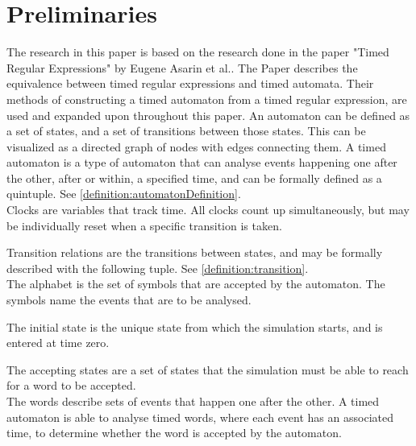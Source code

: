 \section{Preliminaries}






The research in this paper is based on the research done in the paper "Timed Regular Expressions" by Eugene Asarin et al.\cite{Eugene2001}. The Paper describes the equivalence between timed regular expressions and timed automata. Their methods of constructing a timed automaton from a timed regular expression, are used and expanded upon throughout this paper.
An automaton can be defined as a set of states, and a set of transitions between those states. This can be visualized as a directed graph of nodes with edges connecting them.
A timed automaton is a type of automaton that can analyse events happening one after the other, after or within, a specified time, and can be formally defined as a quintuple\cite{ALUR1994}. See \cref{definition:automatonDefinition}.
\\

Clocks are variables that track time. All clocks count up simultaneously, but may be individually reset when a specific transition is taken.

Transition relations are the transitions between states, and may be formally described with the following tuple. See \cref{definition:transition}.
\\

The alphabet is the set of symbols that are accepted by the automaton. The symbols name the events that are to be analysed.

The initial state is the unique state from which the simulation starts, and is entered at time zero.

The accepting states are a set of states that the simulation must be able to reach for a word to be accepted.\\

The words describe sets of events that happen one after the other. A timed automaton is able to analyse timed words, where each event has an associated time, to determine whether the word is accepted by the automaton.
